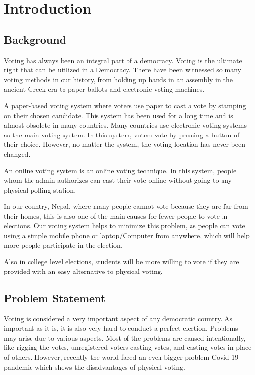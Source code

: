 \documentclass[a4paper,12pt]{report}
\begin{document}
\newpage


\chapter{Introduction}

\section{Background}
Voting has always been an integral part of a democracy.  Voting is the ultimate right that can be utilized in a Democracy.  There  have been witnessed so many voting methods in our history, from holding up hands in an assembly in the ancient Greek era to paper ballots and electronic voting machines.

A paper-based voting system where voters use paper to cast a vote by stamping on their chosen candidate. This system has been used for a long time and is almost obsolete in many countries. Many countries use electronic voting systems as the main voting system. In this system, voters vote by pressing a button of their choice. However, no matter the system, the voting location has never been changed.

An online voting system is an online voting technique. In this system, people whom the admin authorizes can cast their vote online without going to any physical polling station.
 
In our country, Nepal, where many people cannot vote because they are far from their homes, this is also one of the main causes for fewer people to vote in elections. Our voting system helps to minimize this problem, as people can vote using a simple mobile phone or laptop/Computer from anywhere, which will help more people participate in the election. 
 
Also in college level elections, students will be more willing to vote if  they are provided with an easy alternative to physical voting.

\section{Problem Statement}
Voting is considered a very important aspect of any democratic country. 
As important as it is, it is also very hard to conduct a perfect election. Problems may arise due to various aspects. Most of the problems are caused intentionally, like rigging the votes, unregistered voters casting votes, and casting votes in place of others. However, recently the world faced an even bigger problem Covid-19 pandemic which shows the disadvantages of physical voting.
\end{document}
